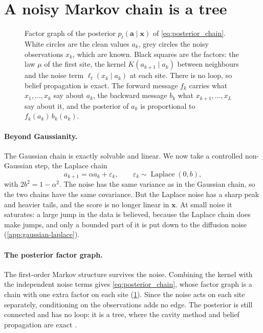\section{A noisy Markov chain is a tree}
\label{sec:tree}

\begin{figure}[t]
  \centering
  
  \caption{Factor graph of the posterior $p_t(\mathbf a\mid\mathbf x)$ of \cref{eq:posterior_chain}. White circles are
  the clean values $a_k$, grey circles the noisy observations $x_k$, which are known. Black squares are the factors: the
  law $\mu$ of the first site, the kernel $K(a_{k+1}\mid a_k)$ between neighbours and the noise term
  $\ell_t(x_k\mid a_k)$ at each site. There is no loop, so belief propagation is exact. The forward message $f_k$ carries
  what $x_1,\ldots,x_k$ say about $a_k$, the backward message $b_k$ what $x_{k+1},\ldots,x_L$ say about it, and the
  posterior of $a_k$ is proportional to $f_k(a_k)\,b_k(a_k)$.}
  \label{fig:factor-graph}
\end{figure}

\paragraph{Beyond Gaussianity.}
The Gaussian chain is exactly solvable and linear. We now take a controlled non-Gaussian step, the Laplace chain
\begin{equation}
    a_{k+1}=\alpha a_k+\varepsilon_k,
    \qquad
    \varepsilon_k\sim\operatorname{Laplace}(0,b),
    \label{eq:laplace_chain}
\end{equation}
with $2b^2=1-\alpha^2$. The noise has the same variance as in the Gaussian chain, so the two chains have the same
covariance. But the Laplace noise has a sharp peak and heavier tails, and the score is no longer linear in $\mathbf x$.
At small noise it saturates: a large jump in the data is believed, because the Laplace chain does make jumps, and only
a bounded part of it is put down to the diffusion noise (\cref{app:gaussian-laplace}).

\paragraph{The posterior factor graph.}
The first-order Markov structure survives the noise. Combining the kernel with the independent noise terms gives
\cref{eq:posterior_chain}, whose factor graph is a chain with one extra factor on each site (\cref{fig:factor-graph}).
Since the noise acts on each site separately, conditioning on the observations adds no edge. The posterior is still
connected and has no loop: it is a tree, where the cavity method and belief propagation are exact
\cite{mezard2001bethe,mezard2006reconstruction,mezard2009information}.

